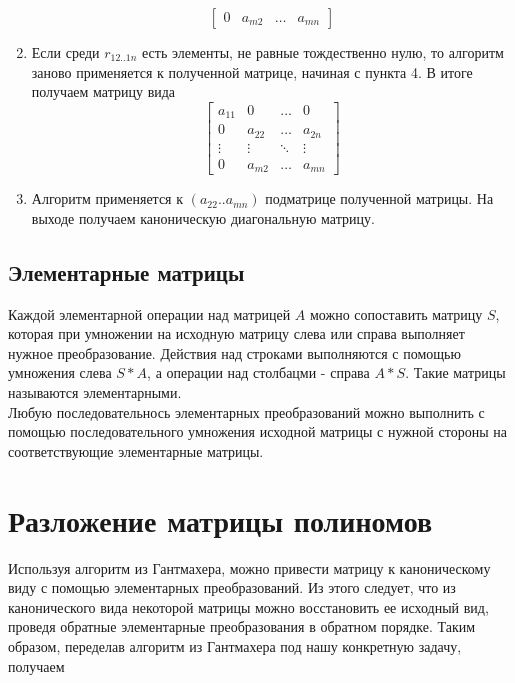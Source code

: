 \documentclass[14pt, a4paper]{extreport}
\begin{document}
\begin{enumerate}
\[\begin{bmatrix}
				0 & a_{m2} & \dots & a_{mn}
			\end{bmatrix}
			\]
			\item Если среди $r_{12..1n}$ есть элементы, не равные тождественно
			нулю, то алгоритм заново применяется к полученной матрице, начиная
			с пункта 4. В итоге получаем матрицу вида
			\[
			\begin{bmatrix}
				a_{11} & 0 & \dots & 0 \\
				0 & a_{22} & \dots & a_{2n} \\
				\vdots & \vdots & \ddots & \vdots \\
				0 & a_{m2} & \dots & a_{mn}
			\end{bmatrix}
			\]
			\item Алгоритм применяется к $(a_{22}..a_{mn})$ подматрице полученной матрицы.
			На выходе получаем каноническую диагональную матрицу.
		\end{enumerate}
		\newpage
		\section{Элементарные матрицы}
			Каждой элементарной операции над матрицей $A$ можно сопоставить матрицу $S$,
			которая при умножении на исходную матрицу слева или справа выполняет нужное
			преобразование. Действия над строками выполняются с помощью умножения слева
			$S*A$, а операции над столбацми - справа $A*S$. Такие матрицы называются
			элементарными. \\ Любую последовательнось элементарных преобразований можно
			выполнить с помощью последовательного умножения исходной матрицы с нужной
			стороны на соответствующие элементарные матрицы.
	\chapter{Разложение матрицы полиномов}
		Используя алгоритм из Гантмахера, можно привести матрицу к каноническому виду с
		помощью элементарных преобразований. Из этого следует, что из канонического
		вида некоторой матрицы можно восстановить ее исходный вид, проведя обратные
		элементарные преобразования в обратном порядке. Таким образом, переделав
		алгоритм из Гантмахера под нашу конкретную задачу, получаем
\end{document}
